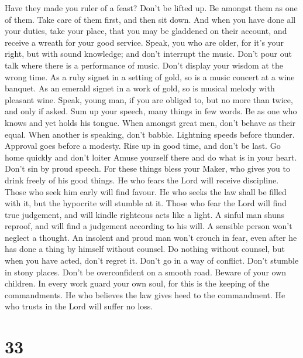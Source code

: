 Have they made you ruler of a feast? Don't be lifted up. Be
amongst them as one of them. Take care of them first, and then sit down.
 And when you have done all your duties, take your place,
that you may be gladdened on their account, and receive a wreath for
your good service.  Speak, you who are older, for it's your
right, but with sound knowledge; and don't interrupt the music.
 Don't pour out talk where there is a performance of music.
Don't display your wisdom at the wrong time.  As a ruby
signet in a setting of gold, so is a music concert at a wine banquet.
 As an emerald signet in a work of gold, so is musical
melody with pleasant wine.  Speak, young man, if you are
obliged to, but no more than twice, and only if asked.  Sum
up your speech, many things in few words. Be as one who knows and yet
holds his tongue.  When amongst great men, don't behave as
their equal. When another is speaking, don't babble. 
Lightning speeds before thunder. Approval goes before a modesty.
 Rise up in good time, and don't be last. Go home quickly
and don't loiter  Amuse yourself there and do what is in
your heart. Don't sin by proud speech.  For these things
bless your Maker, who gives you to drink freely of his good things.
 He who fears the Lord will receive discipline. Those who
seek him early will find favour.  He who seeks the law
shall be filled with it, but the hypocrite will stumble at it.
 Those who fear the Lord will find true judgement, and will
kindle righteous acts like a light.  A sinful man shuns
reproof, and will find a judgement according to his will. 
A sensible person won't neglect a thought. An insolent and proud man
won't crouch in fear, even after he has done a thing by himself without
counsel.  Do nothing without counsel, but when you have
acted, don't regret it.  Don't go in a way of conflict.
Don't stumble in stony places.  Don't be overconfident on a
smooth road.  Beware of your own children.  In
every work guard your own soul, for this is the keeping of the
commandments.  He who believes the law gives heed to the
commandment. He who trusts in the Lord will suffer no loss.

\hypertarget{section-11}{%
\section{33}\label{section-11}}

